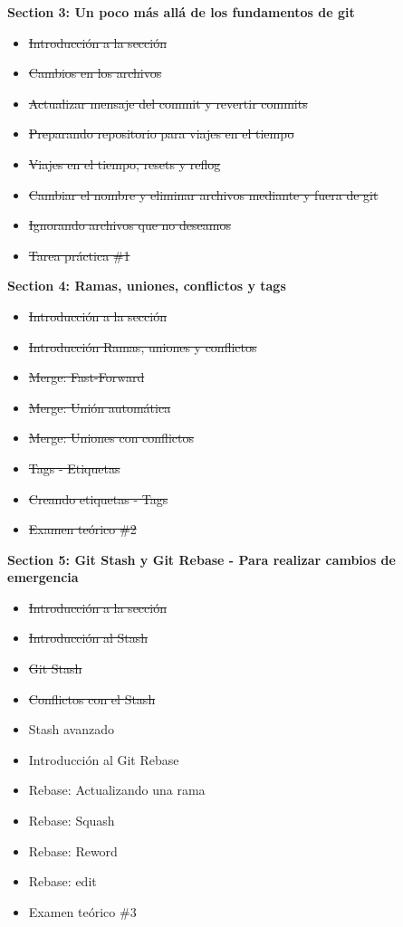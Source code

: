 \documentclass[
]{book}
\providecommand{\tightlist}{%
  \setlength{\itemsep}{0pt}\setlength{\parskip}{0pt}}
\begin{document}
\textbf{Section 3: Un poco más allá de los fundamentos de git}

\begin{itemize}
\tightlist
\item
  \st{Introducción a la sección}
\item
  \st{Cambios en los archivos}
\item
  \st{Actualizar mensaje del commit y revertir commits}
\item
  \st{Preparando repositorio para viajes en el tiempo}
\item
  \st{Viajes en el tiempo, resets y reflog}
\item
  \st{Cambiar el nombre y eliminar archivos mediante y fuera de git}
\item
  \st{Ignorando archivos que no deseamos}
\item
  \st{Tarea práctica \#1}
\end{itemize}

\textbf{Section 4: Ramas, uniones, conflictos y tags}

\begin{itemize}
\tightlist
\item
  \st{Introducción a la sección}
\item
  \st{Introducción Ramas, uniones y conflictos}
\item
  \st{Merge: Fast-Forward}
\item
  \st{Merge: Unión automática}
\item
  \st{Merge: Uniones con conflictos}
\item
  \st{Tags - Etiquetas}
\item
  \st{Creando etiquetas - Tags}
\item
  \st{Examen teórico \#2}
\end{itemize}

\textbf{Section 5: Git Stash y Git Rebase - Para realizar cambios de emergencia}

\begin{itemize}
\tightlist
\item
  \st{Introducción a la sección}
\item
  \st{Introducción al Stash}
\item
  \st{Git Stash}
\item
  \st{Conflictos con el Stash}
\item
  Stash avanzado
\item
  Introducción al Git Rebase
\item
  Rebase: Actualizando una rama
\item
  Rebase: Squash
\item
  Rebase: Reword
\item
  Rebase: edit
\item
  Examen teórico \#3
\end{itemize}
\end{document}
